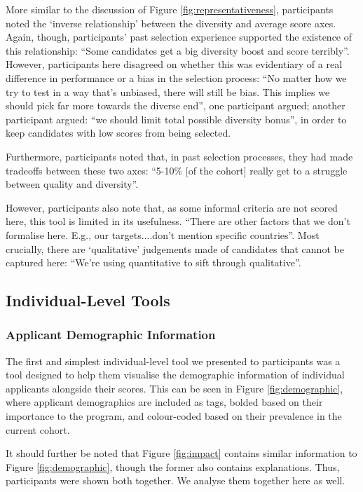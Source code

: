More similar to the discussion of Figure \ref{fig:representativeness}, participants noted the `inverse relationship' between the diversity and average score axes. Again, though, participants' past selection experience supported the existence of this relationship: ``Some candidates get a big diversity boost and score terribly''. However, participants here disagreed on whether this was evidentiary of a real difference in performance or a bias in the selection process: ``No matter how we try to test in a way that's unbiased, there will still be bias. This implies we should pick far more towards the diverse end'', one participant argued; another participant argued: ``we should limit total possible diversity bonus'', in order to keep candidates with low scores from being selected.

Furthermore, participants noted that, in past selection processes, they had made tradeoffs between these two axes: ``5-10\% [of the cohort] really get to a struggle between quality and diversity''.

However, participants also note that, as some informal criteria are not scored here, this tool is limited in its usefulness. ``There are other factors that we don't formalise here. E.g., our targets....don't mention specific countries''. Most crucially, there are `qualitative' judgements made of candidates that cannot be captured here: ``We're using quantitative to sift through qualitative''.

\subsection{Individual-Level Tools}
\subsubsection{Applicant Demographic Information}
The first and simplest individual-level tool we presented to participants was a tool designed to help them visualise the demographic information of individual applicants alongside their scores. This can be seen in Figure \ref{fig:demographic}, where applicant demographics are included as tags, bolded based on their importance to the program, and colour-coded based on their prevalence in the current cohort. 

It should further be noted that Figure \ref{fig:impact} contains similar information to Figure \ref{fig:demographic}, though the former also contains explanations. Thus, participants were shown both together. We analyse them together here as well.

